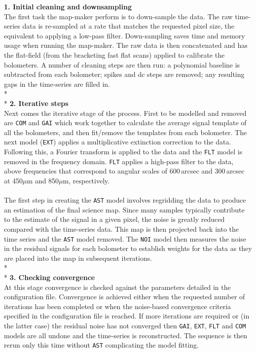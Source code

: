 \documentclass[twoside,11pt]{article}
\renewcommand{\_}{\texttt{\symbol{95}}}
\begin{document}
\begin{center}
\begin{minipage}[t]{0.95\linewidth}
\textbf{1. Initial cleaning and downsampling}\\
The first task the map-maker perform is to down-sample the data. The
raw time-series data is re-sampled at a rate that matches the
requested pixel size, the equivalent to applying a low-pass filter.
Down-sampling saves time and memory usage when running the map-maker.
The raw data is then concatenated and has the flat-field (from the
bracketing fast flat scans) applied to calibrate the bolometers. A
number of cleaning steps are then run: a polynomial baseline is
subtracted from each bolometer; spikes and dc steps are removed; any
resulting gaps in the time-series are filled in.
\\*\\*
\textbf{2. Iterative steps}\\
Next comes the iterative stage of the process. First to be modelled
and removed are \texttt{COM} and \texttt{GAI} which work together to
calculate the average signal template of all the bolometers, and then
fit/remove the templates from each bolometer. The next model
(\texttt{EXT}) applies a multiplicative extinction correction to the
data. Following this, a Fourier transform is applied to the data and
the \texttt{FLT} model is removed in the frequency domain.
\texttt{FLT} applies a high-pass filter to the data, above frequencies
that correspond to angular scales of 600\,arcsec and 300\,arcsec at
450$\mu$m and 850$\mu$m, respectively.
\\\\
The first step in creating the  \texttt{AST} model involves
regridding the data to produce an estimation of the final science map.
Since many samples typically contribute to the estimate of the signal
in a given pixel, the noise is greatly reduced compared with the
time-series data. This map is then projected back into the time series
and the \texttt{AST} model removed. The \texttt{NOI} model then
measures the noise in the residual signals for each bolometer to
establish weights for the data as they are placed into the map in
subsequent iterations.
\\*\\*
\textbf{3. Checking convergence}\\
At this stage convergence is checked against the parameters detailed
in the configuration file. Convergence is achieved either when the
requested number of iterations has been completed or when the
noise-based convergence criteria specified in the configuration file
is reached. If more iterations are required or (in the latter case)
the residual noise has not converged then \texttt{GAI}, \texttt{EXT},
\texttt{FLT} and \texttt{COM} models are all undone and the
time-series is reconstructed. The sequence is then rerun only this
time without \texttt{AST} complicating the model fitting.
\end{minipage}
\end{center}
\end{document}
